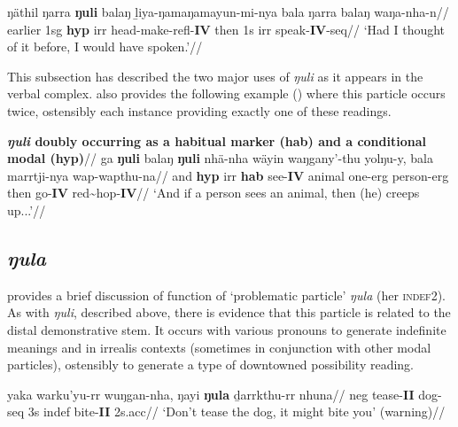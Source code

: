 \a{}\begingl \gla ŋäthil ŋarra \textbf{ŋuli} balaŋ ḻiya-ŋamaŋamayun-mi-nya bala ŋarra balaŋ waŋa-nha-n//
\glb earlier 1sg \textbf{\gls{hyp}} \gls{irr} head-make-\gls{refl}-\textbf{IV} then 1s \gls{irr} speak-\textbf{IV}-\gls{seq}//
\glft`Had I thought of it before, I would have spoken.'//\endgl
\xe


This subsection has described the two major uses of \textit{ŋuli} as it appears in the verbal complex. \citet[353]{Wilkinson1991} also provides the following example (\nextx) where this particle occurs twice, ostensibly each instance providing exactly one of these readings.

\pex\begingl\glpreamble{}\textbf{\textit{ŋuli} doubly occurring as a habitual marker (\gls{hab}) and a conditional modal (\gls{hyp})}//
\gla ga \textbf{ŋuli} balaŋ \textbf{ŋuli} nhä-nha wäyin waŋgany'-thu yolŋu-y, bala marrtji-nya wap-wapthu-na//
\glb and \textbf{\gls{hyp}} \gls{irr} \textbf{\gls{hab}} see-\textbf{IV} animal one-\gls{erg} person-\gls{erg} then go-\textbf{IV} \gls{red}\textasciitilde{hop}-\textbf{IV}//
\glft`And if a person sees an animal, then (he) creeps up...'//
\endgl
{}\xe

\subsection*{\textit{ŋula}} 

\citet[710]{Wilkinson1991} provides a brief discussion of function of `problematic particle' \textit{ŋula} (her \textsc{indef2}). As with \textit{ŋuli}, described above, there is evidence that this particle is related to the distal demonstrative stem. It occurs with various pronouns to generate indefinite meanings and in irrealis contexts (sometimes in conjunction with other modal particles), ostensibly to generate a type of downtowned possibility reading.

\pex\begingl\gla yaka warku'yu-rr wuŋgan-nha, ŋayi \textbf{ŋula} ḏarrkthu-rr nhuna//
\glb \gls{neg} tease-\textbf{II} dog-\gls{seq} 3s \gls{indef} bite-\textbf{II} 2s.\gls{acc}//
\glft`Don't tease the dog, it might bite you' (warning)//\endgl\xe


